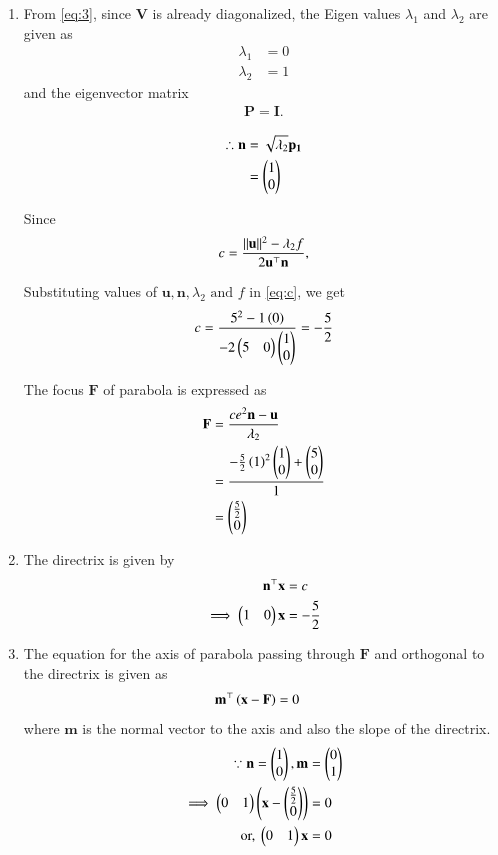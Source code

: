 \documentclass[journal,12pt,twocolumn]{IEEEtran}
\renewcommand{\vec}[1]{\boldsymbol{\mathbf{#1}}}
\begin{document}
\begin{enumerate}
\item From \eqref{eq:3}, since $\vec{V}$ is already diagonalized, the Eigen values $\lambda_1$ and $\lambda_2$ are given as 
\begin{align}
	\lambda_1 &= 0 \\
	\lambda_2 &= 1 
\end{align}
and the eigenvector matrix
\begin{align}
	\vec{P} = \vec{I}.
\end{align}

\begin{align}
	\therefore 
	\vec{n} &= \sqrt{\lambda_2}\vec{p_1} \\
	&= \myvec{1 \\ 0} 
\end{align}

Since
\begin{align}
	\label{eq:c}
	c = \frac{\norm{\vec{u}}^2-\lambda_2f}{2\vec{u}^\top\vec{n}},
\end{align}

Substituting values of $\vec{u}, \vec{n}, \lambda_2 \text{ and } f$ in \eqref{eq:c}, we get
\begin{align}
	c &= \frac{5^2-1\left(0\right)}{-2 \begin{pmatrix}5 & 0\end{pmatrix}\begin{pmatrix}1 \\ 0\end{pmatrix}} = -\frac{5}{2} \\
\end{align}

The focus $\vec{F}$ of parabola is expressed as
\begin{align}
	\vec{F} &= \frac{ce^2\vec{n}-\vec{u}}{\lambda_2} \\
	&= \frac{-\frac{5}{2}\brak{1}^2\myvec{1 \\0} + \myvec{5 \\ 0}}{1} \\
	&= \myvec{\frac{5}{2} \\ 0}
\end{align}

\item  The directrix is given by
\begin{align}
	\vec{n}^\top\vec{x} &= c \\
\implies	\myvec{1 & 0}\vec{x} &= -\frac{5}{2} \\
\end{align}

\item The equation for the axis of parabola passing through $\vec{F}$ and orthogonal to the directrix is given as  
\begin{align}
	\vec{m}^\top\brak{\vec{x}-\vec{F}} &= 0
\end{align}
where $\vec{m}$ is the normal vector to the axis and also the slope of the directrix.
\begin{align}
	\because \vec{n} = \myvec{1 \\ 0 }, \vec{m} &= \myvec{0 \\ 1} \\
	\implies \myvec{0 & 1}\myvec{\vec{x} - \myvec{\frac{5}{2} \\ 0}} &= 0\\
	\text{or, }	\myvec{0 & 1}\vec{x} &= 0 
\end{align}


\end{enumerate}
\end{document}
